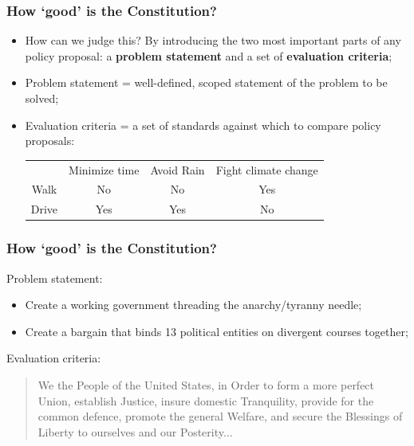 \documentclass[aspectratio=169]{beamer}
\theoremstyle{principle}
\begin{document}
\begin{frame}
\frametitle{How `good' is the Constitution?}

\begin{itemize}
\item<1-> How can we judge this?  By introducing the two most important parts of any policy proposal: a \textbf{problem statement} and a set of \textbf{evaluation criteria};
\bigskip
\bigskip

\item Problem statement = well-defined, scoped statement of the problem to be solved;
\bigskip
\bigskip

\item Evaluation criteria = a set of standards against which to compare policy proposals:
\bigskip
\begin{center}
\begin{tabular}{ cccc } 
  & Minimize time & Avoid Rain & Fight climate change\\ 
Walk & No & No & Yes\\ 
Drive & Yes & Yes & No \\ 

\end{tabular}
\end{center}
\bigskip
\bigskip
\bigskip
\end{itemize}

\end{frame}

\begin{frame}
\frametitle{How `good' is the Constitution?}

Problem statement:\\
\begin{itemize}
\item Create a working government threading the anarchy/tyranny needle;
\item Create a bargain that binds 13 political entities on divergent courses together;
\end{itemize}
\bigskip


Evaluation criteria:\\
\bigskip
\begin{quote}We the People of the United States, in Order to form a more perfect Union, establish Justice, insure domestic Tranquility, provide for the common defence, promote the general Welfare, and secure the Blessings of Liberty to ourselves and our Posterity...
\end{quote}

\end{frame}
\end{document}
